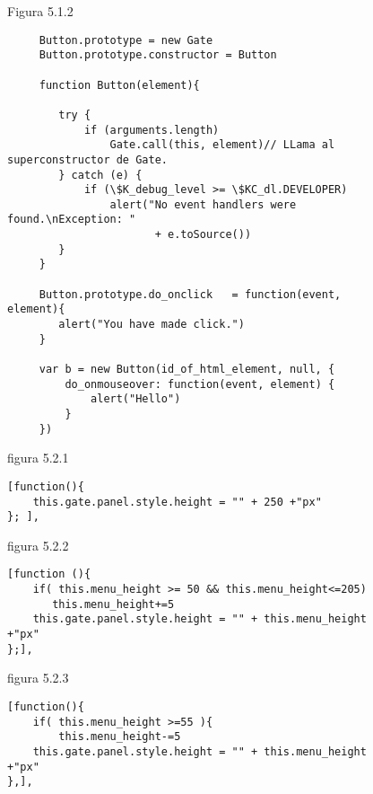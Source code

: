 \begin{figure}
Figura 5.1.2
\begin{verbatim}
     Button.prototype = new Gate
     Button.prototype.constructor = Button

     function Button(element){

        try {
            if (arguments.length)
                Gate.call(this, element)// LLama al superconstructor de Gate.
        } catch (e) {
            if (\$K_debug_level >= \$KC_dl.DEVELOPER)
                alert("No event handlers were found.\nException: " 
                       + e.toSource())
        }
     }

     Button.prototype.do_onclick   = function(event, element){
        alert("You have made click.")
     }

     var b = new Button(id_of_html_element, null, {
         do_onmouseover: function(event, element) {
             alert("Hello")
         }
     })
\end{verbatim}
\end{figure}
 
\begin{figure}
figura 5.2.1
\begin{verbatim}
[function(){
    this.gate.panel.style.height = "" + 250 +"px" 
}; ],
\end{verbatim}
\end{figure}


\begin{figure}
figura 5.2.2
\begin{verbatim}
[function (){
    if( this.menu_height >= 50 && this.menu_height<=205)
       this.menu_height+=5
    this.gate.panel.style.height = "" + this.menu_height +"px"
};],
\end{verbatim}
\end{figure}


\begin{figure}
figura 5.2.3
\begin{verbatim}
[function(){
    if( this.menu_height >=55 ){         
        this.menu_height-=5
    this.gate.panel.style.height = "" + this.menu_height +"px"
},],
\end{verbatim}
\end{figure}

